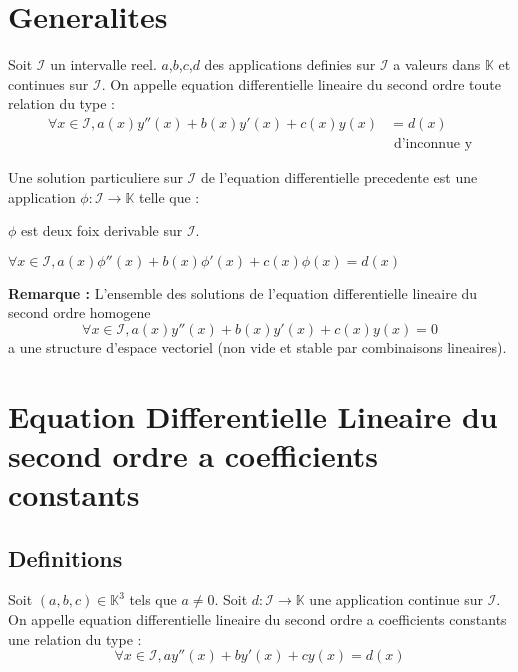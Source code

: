 \documentclass[12pt,twoside,a4paper]{article}
\author{MPSI 2}
\begin{document}
	\maketitle
	\section{Generalites}
		\begin{defi}
			Soit $\mathcal{I}$ un intervalle reel.
			$a$,$b$,$c$,$d$ des applications definies sur $\mathcal{I}$ a valeurs dans $\mathbb{K}$ et continues sur $\mathcal{I}$.
			On appelle equation differentielle lineaire du second ordre toute relation du type :
			$$\begin{aligned}
				\forall x\in\mathcal{I},a\left(x\right)y''\left(x\right)+b\left(x\right)y'\left(x\right)+c\left(x\right)y\left(x\right)&=d\left(x\right)\\
																												   &\text{ d'inconnue y}
			\end{aligned}$$
		\end{defi}
		\begin{defi}
			Une solution particuliere sur $\mathcal{I}$ de l'equation differentielle precedente est une application $\phi\colon\mathcal{I}\longrightarrow\mathbb{K}$ telle que :
			\begin{liste}
				\item $\phi$ est deux foix derivable sur $\mathcal{I}$.
				\item $\forall x\in\mathcal{I},a\left(x\right)\phi''\left(x\right)+b\left(x\right)\phi'\left(x\right)+c\left(x\right)\phi\left(x\right)=d\left(x\right)$
			\end{liste}
		\end{defi}
		\textbf{Remarque :} L'ensemble des solutions de l'equation differentielle lineaire du second ordre homogene
		$$
			\forall x\in\mathcal{I},a\left(x\right)y''\left(x\right)+b\left(x\right)y'\left(x\right)+c\left(x\right)y\left(x\right)=0
		$$
		a une structure d'espace vectoriel (non vide et stable par combinaisons lineaires).
		
	\section{Equation Differentielle Lineaire du second ordre a coefficients constants}
		\subsection{Definitions}
			\begin{defi}
				Soit $\left(a,b,c\right)\in\mathbb{K}^3$ tels que $a\neq0$.
				Soit $d\colon\mathcal{I}\longrightarrow\mathbb{K}$ une application continue sur $\mathcal{I}$.
				On appelle equation differentielle lineaire du second ordre a coefficients constants une relation du type :
				$$
					\forall x\in\mathcal{I},ay''\left(x\right)+by'\left(x\right)+cy\left(x\right)=d\left(x\right)
				$$
			\end{defi}
		\newpage
\end{document}

